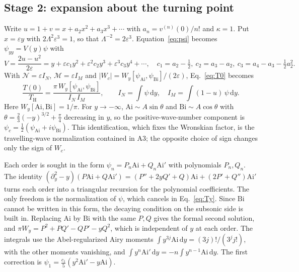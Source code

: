 \documentclass[10pt,a4paper]{article}
\newcommand{\HawkingT}{T_{\mathrm H}}
\newcommand{\dd}{\mathrm d}
\newcommand{\Ai}{\mathrm{Ai}}
\newcommand{\Bi}{\mathrm{Bi}}
\begin{document}
\subsection{Stage 2: expansion about the turning point}
\label{sec:stage2}
Write $u=1+v=x+a_2x^2+a_3x^3+\cdots$ with $a_n=v^{(n)}(0)/n!$ and
$\kappa=1$. Put $x=\varepsilon y$ with $2\Lambda^2\varepsilon^3=1$, so that
$\Lambda^{-2}=2\varepsilon^3$. Equation~\eqref{eq:psi} becomes
$\psi_{yy}=V(y)\psi$ with
\begin{equation}
 V=\frac{2u-u^2}{2\varepsilon}=y+\varepsilon c_1y^2+\varepsilon^2c_2y^3
 +\varepsilon^3c_3y^4+\cdots,\quad
 c_1=a_2-\tfrac12,\ c_2=a_3-a_2,\ c_3=a_4-a_3-\tfrac12a_2^2 .
\end{equation}
With $\mathcal{N}=\varepsilon I_N$, $\mathcal{M}=\varepsilon I_M$ and
$|W_c|=W_y[\psi_{\Ai},\psi_{\Bi}]/(2\varepsilon)$, Eq.~\eqref{eq:T0} becomes
\begin{equation}
 \frac{T(0)}{\HawkingT}=\frac{\pi\,W_y[\psi_{\Ai},\psi_{\Bi}]}{I_N\,I_M},\qquad
 I_N=\int\psi\,\dd y,\quad I_M=\int(1-u)\,\psi\,\dd y .
 \label{eq:Ty}
\end{equation}
Here $W_y[\Ai,\Bi]=1/\pi$. For $y\to-\infty$, $\Ai\sim A\sin\theta$ and
$\Bi\sim A\cos\theta$ with $\theta=\tfrac23(-y)^{3/2}+\tfrac\pi4$
decreasing in $y$, so the positive-wave-number component is
$\psi_c=\tfrac12(\psi_{\Ai}+i\psi_{\Bi})$. This identification, which
fixes the Wronskian factor, is the travelling-wave normalization contained
in A3; the opposite choice of sign changes only the sign of $W_c$.

Each order is sought in the form $\psi_n=P_n\Ai+Q_n\Ai'$ with polynomials
$P_n,Q_n$. The identity
$(\partial_y^2-y)(P\Ai+Q\Ai')=(P''+2yQ'+Q)\Ai+(2P'+Q'')\Ai'$ turns each
order into a triangular recursion for the polynomial coefficients. The only
freedom is the normalization of $\psi$, which cancels in
Eq.~\eqref{eq:Ty}. Since $\Bi$ cannot be written in this form, the decaying
condition on the subsonic side is built in. Replacing $\Ai$ by $\Bi$ with
the same $P,Q$ gives the formal second solution, and
$\pi W_y=P^2+PQ'-QP'-yQ^2$, which is independent of $y$ at each order.
The integrals use the Abel-regularized Airy moments
$\int y^{3j}\Ai\,\dd y=(3j)!/(3^jj!)$, with the other moments vanishing,
and $\int y^n\Ai'\,\dd y=-n\int y^{n-1}\Ai\,\dd y$. The first correction is
$\psi_1=\tfrac{c_1}{5}(y^2\Ai'-y\Ai)$.
\end{document}
